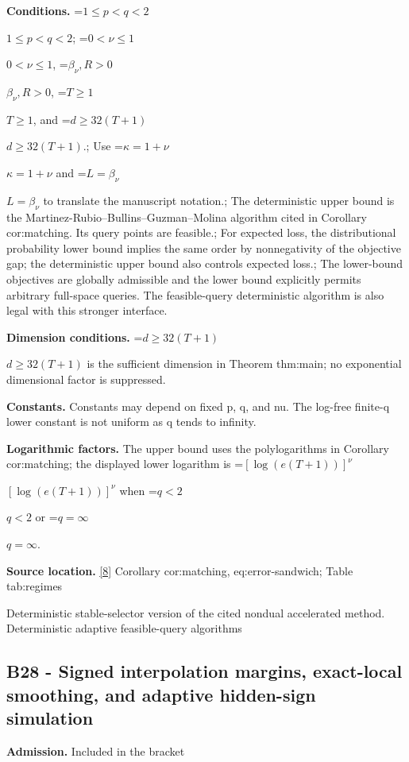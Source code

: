 \documentclass[10pt,a4paper]{article}
\newcommand{\AtlasMath}[1]{\par\begingroup\centering\setbox0=\hbox{$\displaystyle #1$}\ifdim\wd0>1.4\linewidth\typeout{ATLAS WIDE FORMULA: \the\wd0}\fi\ifdim\wd0>\linewidth\resizebox{\linewidth}{!}{\box0}\else\box0\fi\par\endgroup}
\newcommand{\AtlasInlineMath}[1]{\begingroup\setbox0=\hbox{$#1$}\ifdim\wd0>.4\linewidth\endgroup\AtlasMath{#1}\else\endgroup$#1$\fi}
\begin{document}
\textbf{Conditions.} \AtlasInlineMath{1\le p<q<2}; \AtlasInlineMath{0<\nu\le1}, \AtlasInlineMath{\beta_\nu,R>0}, \AtlasInlineMath{T\ge1}, and \AtlasInlineMath{d\ge32(T+1)}.; Use \AtlasInlineMath{\kappa=1+\nu} and \AtlasInlineMath{L=\beta_\nu} to translate the manuscript notation.; The deterministic upper bound is the Martinez-Rubio--Bullins--Guzman--Molina algorithm cited in Corollary cor:matching. Its query points are feasible.; For expected loss, the distributional probability lower bound implies the same order by nonnegativity of the objective gap; the deterministic upper bound also controls expected loss.; The lower-bound objectives are globally admissible and the lower bound explicitly permits arbitrary full-space queries. The feasible-query deterministic algorithm is also legal with this stronger interface.



\textbf{Dimension conditions.} \AtlasInlineMath{d\ge32(T+1)} is the sufficient dimension in Theorem thm:main; no exponential dimensional factor is suppressed.



\textbf{Constants.} Constants may depend on fixed p, q, and nu. The log-free finite-q lower constant is not uniform as q tends to infinity.



\textbf{Logarithmic factors.} The upper bound uses the polylogarithms in Corollary cor:matching; the displayed lower logarithm is \AtlasInlineMath{[\log(e(T+1))]^\nu} when \AtlasInlineMath{q<2} or \AtlasInlineMath{q=\infty}.



\textbf{Source location.} \href{https://github.com/WU-Wendao/Colombo/blob/main/colombo_sensorium/Complexity_altas/data/sources/colombo/B1/manuscript.pdf}{[8]} Corollary cor:matching, eq:error-sandwich; Table tab:regimes



Deterministic stable-selector version of the cited nondual accelerated method. Deterministic adaptive feasible-query algorithms



\subsection{B28 - Signed interpolation margins, exact-local smoothing, and adaptive hidden-sign simulation}


\textbf{Admission.} Included in the bracket
\end{document}
